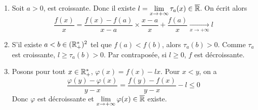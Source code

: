 \begin{solution}
	\phantom{}
	\begin{enumerate}
		\item Soit $a>0$, \function{\tau_{a}}{\R}{]a,+\infty[}{x}{\frac{f(x)-f(a)}{x-a}}
		est croissante. Donc il existe $l=\lim\limits_{x\to+\infty}\tau_{a}(x)\in\overline{\mathbb{R}}$. On écrit alors 
		$$\frac{f(x)}{x}=\frac{f(x)-f(a)}{x-a}\times \frac{x-a}{x}+\frac{f(a)}{x}\xrightarrow[x\to+\infty]{}l$$

		\item S'il existe $a<b\in(\mathbb{R}_{+}^{*})^{2}$ tel que $f(a)<f(b)$, alors $\tau_{a}(b)>0$. Comme $\tau_{a}$ est croissante, $l\geqslant\tau_{a}(b)>0$. Par contraposée, si $l\geqslant0$, $f$ est décroissante.
		\item Posons pour tout $x\in\mathbb{R}_{+}^{*}$, $\varphi(x)=f(x)-lx$. Pour $x<y$, on a 
		$$\frac{\varphi(y)-\varphi(x)}{y-x}=\frac{f(y)-f(x)}{y-x}-l\leqslant0$$
		Donc $\varphi$ est décroissante et $\lim\limits_{x\to+\infty}\varphi(x)\in\overline{\mathbb{R}}$ existe.
	\end{enumerate}
\end{solution}

